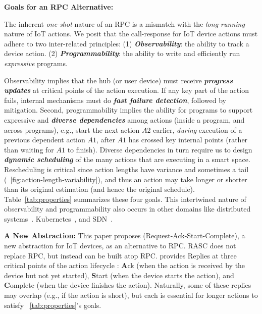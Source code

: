 \noindent \textbf{Goals for an RPC Alternative: }
{The inherent {\it one-shot} nature of an RPC is a mismatch with the {\it long-running} nature of IoT actions.  We posit that the call-response for IoT device actions must adhere to two inter-related principles: 
\noindent (1) \textbf{\textit{Observability}}: the ability to track a device action.
\noindent (2) \textbf{\textit{Programmability}}: the ability to write and efficiently run {\it expressive} programs.

Observability implies that the hub (or user device) must receive \textbf{\textit{progress updates}} at critical points of the action execution. If any key part of the action fails, internal mechanisms must do  \textbf{\textit{fast failure detection}}, followed by mitigation. Second, programmability implies the ability for programs to support expressive and \textbf{\textit{diverse dependencies}} among actions (inside a program, and across programs), e.g., start the next action $A2$ earlier, {\it during} execution of a previous dependent action $A1$, after $A1$ has crossed key internal points (rather than waiting for $A1$ to finish). Diverse dependencies in turn require us to design \textbf{\textit{dynamic scheduling}} of the many actions that are executing in a smart space. Rescheduling is critical since action lengths have variance and sometimes a tail (\Figure~\ref{fig:action-length-variability}), and thus an action may take longer or shorter than its original estimation (and hence the original schedule). 
%
Table~\ref{tab:properties} summarizes these four goals.
%
This intertwined nature of observability and programmability also occurs in other domains like distributed systems~\cite{omnitable,viperprobe}. Kubernetes~\cite{kubern8observability}, and  SDN~\cite{simon}.

}


\noindent \textbf{A New Abstraction:}
This paper proposes {\it \abs} (Request-Ack-Start-Complete), a new abstraction for IoT devices, as an alternative to RPC. RASC does not replace RPC, but instead can be built atop RPC.
\abs{} provides Replies at three critical points of the action lifecycle
: {\bf A}ck (when the action is received by the device but not yet started), {\bf S}tart (when the device starts the action), and {\bf C}omplete (when the device finishes the action). Naturally, some of these replies may overlap   (e.g., if the action is short), but each is essential for longer actions
to satisfy \Table~\ref{tab:properties}'s goals. 

